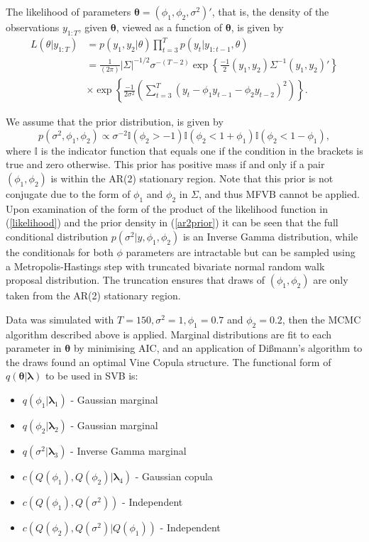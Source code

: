 \documentclass[12pt,a4paper]{article}%
\numberwithin{equation}{section}
\begin{document}
The likelihood of parameters $\boldsymbol{\theta} = (\phi_1, \phi_2, \sigma^2)'$, that is, the density of the observations $y_{1:T}$, given $\boldsymbol{\theta}$, viewed as a function of $\boldsymbol{\theta}$, is given by
\begin{align}
\label{likelihood}
L(\theta | y_{1:T}) &= p(y_1, y_2 | \theta) \prod_{t=3}^{T}p(y_t | y_{1:t-1}, \theta) \nonumber \\
&= \frac{1}{(2\pi)} |\Sigma|^{-1/2} \sigma^{-(T-2)} \exp \left\{ \frac{-1}{2} (y_1, y_2) \Sigma^{-1} (y_1, y_2)' \right\} \nonumber \\
&\times \exp \left\{ \frac{-1}{2\sigma^2} \left( \sum_{t=3}^{T}(y_t - \phi_1 y_{t-1} - \phi_2 y_{t-2})^2 \right) \right\}.
\end{align}

We assume that the prior distribution, is given by
\begin{equation}
p(\sigma^2, \phi_1, \phi_2) \propto \sigma^{-2} \mathbb{I}(\phi_2 > -1)\mathbb{I}(\phi_2 < 1 + \phi_1) \mathbb{I}(\phi_2 < 1 - \phi_1), 
\label{ar2prior}
\end{equation}
where $\mathbb{I}$ is the indicator function that equals one if the condition in the brackets is true and zero otherwise. This prior has positive mass if and only if a pair $(\phi_1, \phi_2)$ is within the AR(2) stationary region. Note that this prior is not conjugate due to the form of $\phi_1$ and $\phi_2$ in $\Sigma$, and thus MFVB cannot be applied. Upon examination of the form of the product of the likelihood function in (\ref{likelihood}) and the prior density in (\ref{ar2prior}) it can be seen that the full conditional distribution $p(\sigma^2 | y, \phi_1, \phi_2)$ is an Inverse Gamma distribution, while the conditionals for both $\phi$ parameters are intractable but can be sampled using a Metropolis-Hastings step with truncated bivariate normal random walk proposal distribution. The truncation ensures that draws of $(\phi_1,\phi_2)$ are only taken from the AR(2) stationary region. 

Data was simulated with $T = 150, \sigma^2 = 1, \phi_1 = 0.7$ and $\phi_2 = 0.2$, then the MCMC algorithm described above is applied. Marginal distributions are fit to each parameter in $\boldsymbol{\theta}$ by minimising AIC, and an application of Di{\ss}mann's algorithm to the draws found an optimal Vine Copula structure. The functional form of $q(\boldsymbol{\theta} | \boldsymbol{\lambda})$ to be used in SVB is:
\begin{itemize}
\item $q(\phi_1 | \boldsymbol{\lambda}_1)$ - Gaussian marginal
\item $q(\phi_2| \boldsymbol{\lambda}_2)$ - Gaussian marginal
\item $q(\sigma^2| \boldsymbol{\lambda}_3)$ - Inverse Gamma marginal
\item $c(Q(\phi_1), Q(\phi_2) | \boldsymbol{\lambda}_4)$ - Gaussian copula
\item $c(Q(\phi_1), Q(\sigma^2))$ - Independent
\item $c(Q(\phi_2), Q(\sigma^2) | Q(\phi_1))$ - Independent
\end{itemize}
\end{document}
